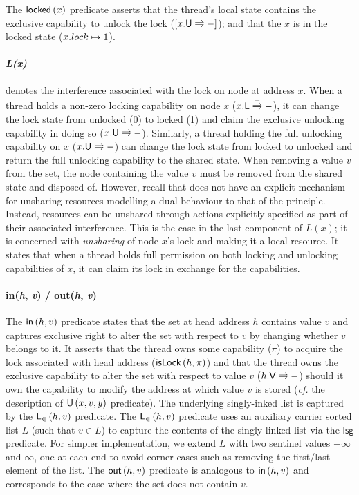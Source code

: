 The $\textsf{locked}\left(x \right)$ predicate asserts that the thread's local state contains the exclusive capability to unlock the lock ($[\unlockT{x}]$); and that the $x$ is in the locked state ($x.lock \mapsto 1$). 

\paragraph{\textit{L(x)}} denotes the interference associated with the lock on node at address $x$. When a thread holds a non-zero locking capability on node $x$ ($\lockC{x}[-]$), it can change the lock state from unlocked (0) to locked (1) and claim the exclusive unlocking capability in doing so ($\unlockC{x}$). 
Similarly, a thread holding the full unlocking capability on $x$ ($\unlockC{x}$) can change the lock state from locked to unlocked and return the full unlocking capability to the shared state. 
When removing a value $v$ from the set, the node containing the value $v$ must be removed from the shared state and disposed of. However, recall that \colosl does not have an explicit mechanism for unsharing resources modelling a dual behaviour to that of the \extendRule principle. Instead, resources can be unshared through actions explicitly specified as part of their associated interference. This is the case in the last component of $L(x)$; it is concerned with \emph{unsharing} of node $x$'s lock and making it a local resource. It states that when a thread holds full permission on both locking and unlocking capabilities of $x$, it can claim its lock in exchange for the capabilities. 

\paragraph{\textsf{in}(\textit{h}, \textit{v}) / \textsf{out}(\textit{h}, \textit{v})}
The $\textsf{in}\left(h, v\right)$ predicate states that the set at head address $h$ contains value $v$ and captures exclusive right to alter the set with respect to $v$ by changing whether $v$ belongs to it. It asserts that the thread owns some capability ($\pi$) to acquire the lock associated with head address ($\textsf{isLock}\left(h, \pi\right)$) and that the thread owns the exclusive capability to alter the set with respect to value $v$ ($\valueC{h}{v}$) should it own the capability to modify the address at which value $v$ is stored (\textit{cf.} the description of $\textsf{U}\left(x, v, y\right)$ predicate). The underlying singly-inked list is captured by the $\textsf{L}_{\in}\left(h, v \right)$ predicate. 
The $\textsf{L}_{\in}\left(h, v \right)$ predicate uses an auxiliary carrier sorted list $L$ (such that $v \in L$) to capture the contents of the singly-linked list via the $\textsf{lsg}$ predicate. For simpler implementation, we extend $L$ with two sentinel values $-\infty$ and $\infty$, one at each end to avoid corner cases such as removing the first/last element of the list. The $\textsf{out}\left(h, v\right)$ predicate is analogous to $\textsf{in}\left(h, v\right)$ and corresponds to the case where the set does not contain $v$.

